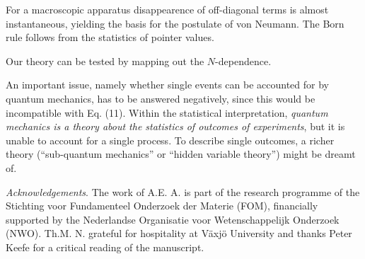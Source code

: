 \documentclass[12pt, onecolumn, aps,prb,floatfix]{revtex4-2}
\begin{document}
For a macroscopic apparatus disappearence of off-diagonal terms 
is almost instantaneous, yielding the basis for the postulate of von Neumann.
The Born rule follows from the statistics of pointer values.

Our theory can be tested by mapping out the $N$-dependence.



An important issue, namely whether single events can be accounted for by 
quantum mechanics, has to be answered negatively, since this would be incompatible 
with Eq. (11).  Within the statistical
interpretation, {\it quantum mechanics is a theory about the statistics of 
outcomes of experiments}, but it is unable to account for a single process. 
To describe single outcomes, a richer theory 
(``sub-quantum mechanics''  or ``hidden variable theory'') might be dreamt of.

{\it Acknowledgements}.
The work of A.E. A. is part of the research programme of the Stichting voor 
Fundamenteel Onderzoek der Materie (FOM), financially supported by 
the Nederlandse Organisatie voor Wetenschappelijk Onderzoek (NWO). 
Th.M. N. grateful for hospitality at V\"axj\"o University
and thanks Peter Keefe for a critical reading of the manuscript.
\end{document}

